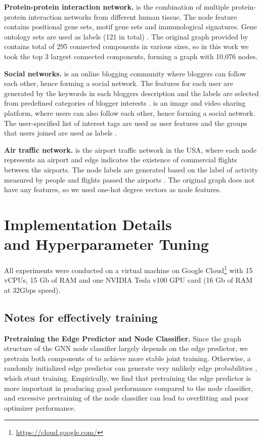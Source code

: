 \documentclass[letterpaper]{article} \usepackage{aaai21}  \usepackage{times}  \usepackage{helvet} \usepackage{courier}  \usepackage[hyphens]{url}  \usepackage{graphicx} \urlstyle{rm} \def\UrlFont{\rm}  \usepackage{natbib}  \usepackage{caption} \frenchspacing  \setlength{\pdfpagewidth}{8.5in}  \setlength{\pdfpageheight}{11in}
\begin{document}
\noindent \textbf{Protein-protein interaction network.} \ppi is the combination of multiple protein-protein interaction networks from different human tissue. The node feature contains positional gene sets, motif gene sets and immunological signatures. Gene ontology sets are used as labels (121 in total) \cite{hamilton2017inductive}. The original graph provided by \cite{hamilton2017inductive} contains total of 295 connected components in various sizes, so in this work we took the top 3 largest connected components, forming a graph with 10,076 nodes. 

\noindent \textbf{Social networks.} \blogc is an online blogging community where bloggers can follow each other,  hence forming a social network. The features for each user are generated by the keywords in each bloggers description and the labels are selected from predefined categories of blogger interests \cite{huang2017label}. \flickr is an image and video sharing platform, where users can also follow each other, hence forming a social network. The user-specified list of interest tags are used as user features and the groups that users joined are used as labels \cite{huang2017label}.

\noindent \textbf{Air traffic network.} \airusa is the airport traffic network in the USA, where each node represents an airport and edge indicates the existence of commercial flights between the airports. The node labels are generated based on the label of activity measured by people and flights passed the airports \cite{wu2019net}. The original graph does not have any features, so we used one-hot degree vectors as node features.


\section{Implementation Details \\ and Hyperparameter Tuning}
All experiments were conducted on a virtual machine on Google Cloud\footnote{\url{https://cloud.google.com/}} with 15 vCPUs, 15 Gb of RAM and one NVIDIA Tesla v100 GPU card (16 Gb of RAM at 32Gbps speed).

\subsection{Notes for effectively training \method}
\label{appn:implementation_gaug}

\noindent \textbf{Pretraining the Edge Predictor and Node Classifier.} Since the graph structure of the GNN node classifier largely depends on the edge predictor, we pretrain both components of \method to achieve more stable joint training. Otherwise, a randomly initialized edge predictor can generate very unlikely edge probabilities , which stunt training.  Empirically, we find that pretraining the edge predictor is more important in producing good performance compared to the node classifier, and excessive pretraining of the node classifier can lead to overfitting and poor optimizer performance.
\end{document}
